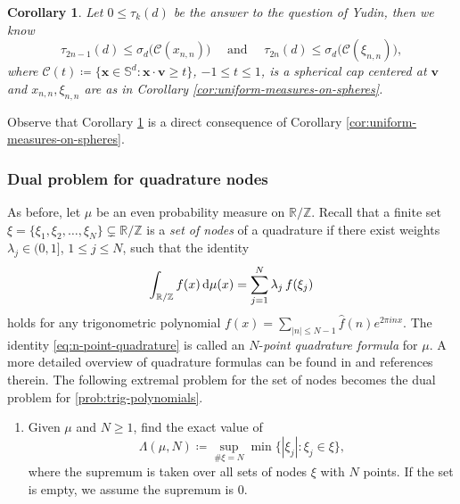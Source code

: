 \documentclass[reqno, a4paper]{amsart}
\def\T{\mathbb{R}/\mathbb{Z}}
\renewcommand{\d}{\text{\rm d}}
\newcommand{\Sd}{\mathbb{S}^d}
\newcommand{\x}{{\bm x}}
\renewcommand{\v}{{\bm v}}
\theoremstyle{plain}
\newtheorem{corollary}[theorem]{Corollary}
\theoremstyle{definition}
\theoremstyle{remarkstyle}
\numberwithin{equation}{section}
\begin{document}
\begin{corollary}\label{cor:yudins-problem}
    Let $0\leq \tau_k(d)$ be the answer to the question of Yudin, then we know 
    \begin{equation*}
        \tau_{2n-1}(d) \leq \sigma_d\bigl(\mathcal{C}(x_{n, n})\bigr)\quad\text{ and }\quad \tau_{2n}(d) \leq \sigma_d\bigl(\mathcal{C}(\xi_{n, n})\bigr),
    \end{equation*}
    where $\mathcal{C}(t)\coloneqq\{\x\in\Sd: \x\cdot\v\geq t\}$, $-1\leq t\leq 1$, is a spherical cap centered at $\v$  and $x_{n,n}, \xi_{n,n}$ are as in Corollary \ref{cor:uniform-measures-on-spheres}. 
\end{corollary}
Observe that Corollary \ref{cor:yudins-problem} is a direct consequence of Corollary \ref{cor:uniform-measures-on-spheres}.


\subsubsection{Dual problem for quadrature nodes}\label{subsec:dual problem for quadratures}
As before, let $\mu$ be an even probability measure on $\T$.  Recall that a finite set $\xi = \{\xi_1, \xi_2, \ldots, \xi_{N}\} \subsetneq \T$ is a \emph{set of nodes} of a quadrature if there exist weights $\lambda_j \in (0,1]$, $1\leq j\leq N$,  such that the identity
\begin{equation}\label{eq:n-point-quadrature}
    \int_{\T} f(x)\,\d\mu(x) = \sum_{j=1}^{N} \lambda_j\, f(\xi_j)
\end{equation}
holds for any trigonometric polynomial $f(x)=\sum_{|n|\leq N-1} \widehat{f}(n) e^{2\pi i n x}$. The identity \eqref{eq:n-point-quadrature} is called an $N$-\emph{point quadrature formula} for $\mu$. A more detailed overview of quadrature formulas can be found in \cite{JonesNjastadThronMomentTheoryOnUnitCircle} and references therein.  The following extremal problem for the set of nodes becomes the dual problem for \ref{prob:trig-polynomials}.

\begin{enumerate}[label=\textbf{(P\arabic*)}, ref=(P\arabic*), start=4]
    \item \label{prob:quadrature-formulas}
    Given $\mu$ and $N \geq 1$, find the exact value of
    \begin{equation*}
        \Lambda(\mu, N) \coloneqq \sup_{\#\xi=N}
        \min\bigl\{|\xi_j| : \xi_j \in \xi \bigr\},
    \end{equation*}
    where the supremum is taken over all sets of nodes $\xi$ with $N$ points. If the set is empty, we assume the supremum is 0.
\end{enumerate}
\end{document}
